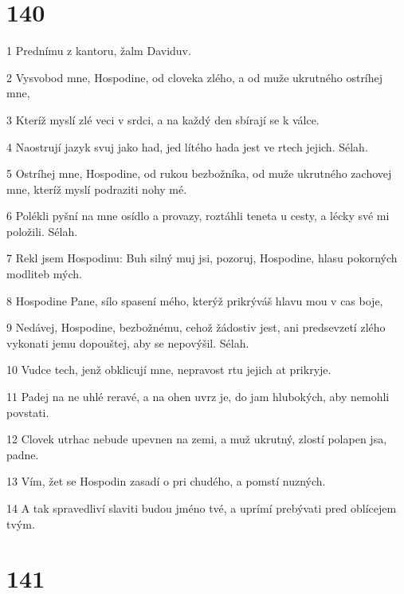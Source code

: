 \chapter{140}

\par 1 Prednímu z kantoru, žalm Daviduv.
\par 2 Vysvobod mne, Hospodine, od cloveka zlého, a od muže ukrutného ostríhej mne,
\par 3 Kteríž myslí zlé veci v srdci, a na každý den sbírají se k válce.
\par 4 Naostrují jazyk svuj jako had, jed lítého hada jest ve rtech jejich. Sélah.
\par 5 Ostríhej mne, Hospodine, od rukou bezbožníka, od muže ukrutného zachovej mne, kteríž myslí podraziti nohy mé.
\par 6 Polékli pyšní na mne osídlo a provazy, roztáhli teneta u cesty, a lécky své mi položili. Sélah.
\par 7 Rekl jsem Hospodinu: Buh silný muj jsi, pozoruj, Hospodine, hlasu pokorných modliteb mých.
\par 8 Hospodine Pane, sílo spasení mého, kterýž prikrýváš hlavu mou v cas boje,
\par 9 Nedávej, Hospodine, bezbožnému, cehož žádostiv jest, ani predsevzetí zlého vykonati jemu dopouštej, aby se nepovýšil. Sélah.
\par 10 Vudce tech, jenž obklicují mne, nepravost rtu jejich at prikryje.
\par 11 Padej na ne uhlé reravé, a na ohen uvrz je, do jam hlubokých, aby nemohli povstati.
\par 12 Clovek utrhac nebude upevnen na zemi, a muž ukrutný, zlostí polapen jsa, padne.
\par 13 Vím, žet se Hospodin zasadí o pri chudého, a pomstí nuzných.
\par 14 A tak spravedliví slaviti budou jméno tvé, a uprímí prebývati pred oblícejem tvým.

\chapter{141}

